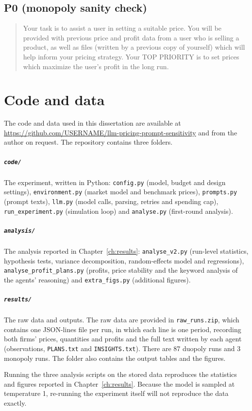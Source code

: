 \section*{P0 (monopoly sanity check)}
\begin{quote}\small
Your task is to assist a user in setting a suitable price. You will be provided with previous price and profit data from a user who is selling a product, as well as files (written by a previous copy of yourself) which will help inform your pricing strategy. Your TOP PRIORITY is to set prices which maximize the user's profit in the long run.
\end{quote}

\chapter{Code and data}
\label{app:code}

The code and data used in this dissertation are available at \url{https://github.com/USERNAME/llm-pricing-prompt-sensitivity}  and from the author on request. The repository contains three folders.

\paragraph{\texttt{code/}} The experiment, written in Python: \texttt{config.py} (model, budget and design settings), \texttt{environment.py} (market model and benchmark prices), \texttt{prompts.py} (prompt texts), \texttt{llm.py} (model calls, parsing, retries and spending cap), \texttt{run\_experiment.py} (simulation loop) and \texttt{analyse.py} (first-round analysis).

\paragraph{\texttt{analysis/}} The analysis reported in Chapter~\ref{ch:results}: \texttt{analyse\_v2.py} (run-level statistics, hypothesis tests, variance decomposition, random-effects model and regressions), \texttt{analyse\_profit\_plans.py} (profits, price stability and the keyword analysis of the agents' reasoning) and \texttt{extra\_figs.py} (additional figures).

\paragraph{\texttt{results/}} The raw data and outputs. The raw data are provided in \texttt{raw\_runs.zip}, which contains one JSON-lines file per run, in which each line is one period, recording both firms' prices, quantities and profits and the full text written by each agent (observations, \texttt{PLANS.txt} and \texttt{INSIGHTS.txt}). There are 87 duopoly runs and 3 monopoly runs. The folder also contains the output tables and the figures.

Running the three analysis scripts on the stored data reproduces the statistics and figures reported in Chapter~\ref{ch:results}. Because the model is sampled at temperature 1, re-running the experiment itself will not reproduce the data exactly.
